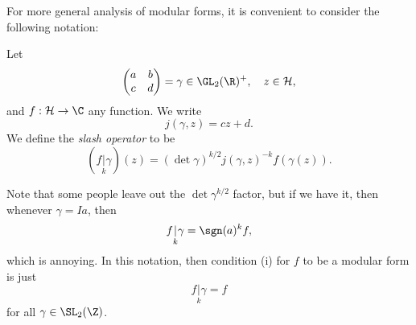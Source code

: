 \documentclass[a4paper]{article}
\renewcommand{\H}{\mathcal{H}}
\begin{document}
For more general analysis of modular forms, it is convenient to consider the following notation:
\begin{defi}
  Let
  \[
    \begin{pmatrix}
      a & b\\
      c & d
    \end{pmatrix} = \gamma \in \GL_2(\R)^+,\quad z \in \H,
  \]
  and $f: \H \to \C$ any function. We write
  \[
    j(\gamma, z) = cz + d.
  \]
  We define the \emph{slash operator} to be
  \[
    (f\underset{k}{|} \gamma) (z) = (\det \gamma)^{k/2} j(\gamma, z)^{-k} f(\gamma(z)).
  \]
\end{defi}
Note that some people leave out the $\det \gamma^{k/2}$ factor, but if we have it, then whenever $\gamma = Ia$, then
\[
  f\underset{k}{|} \gamma = \sgn(a)^k f,
\]
which is annoying. In this notation, then condition (i) for $f$ to be a modular form is just
\[
  f\underset{k}{|}\gamma = f
\]
for all $\gamma \in \SL_2(\Z)$.
\end{document}
